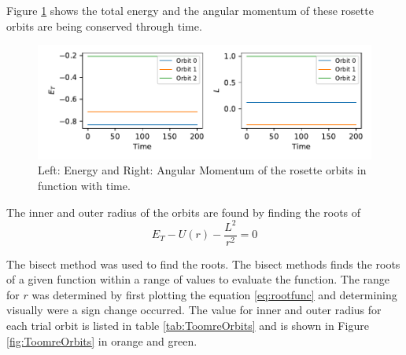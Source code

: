 Figure \ref{fig:conservedQuants} shows the total energy and the angular momentum of these rosette orbits are being conserved through time. 
\begin{figure}[h]
    \centering
    \includegraphics{CodeAndFigures/EnergyMomentumPlot.pdf}
    \caption{Left: Energy and Right: Angular Momentum of the rosette orbits in function with time.}
    \label{fig:conservedQuants}
\end{figure}

The inner and outer radius of the orbits are found by finding the roots of
\begin{equation}
    E_T - U(r) - \frac{L^2}{r^2} = 0
    \label{eq:rootfunc}
\end{equation}

The bisect method was used to find the roots. The bisect methods finds the roots of a given function within a range of values to evaluate the function. The range for $r$ was determined by first plotting the equation \ref{eq:rootfunc} and determining visually were a sign change occurred. The value for inner and outer radius for each trial orbit is listed in table \ref{tab:ToomreOrbits} and is shown in Figure \ref{fig:ToomreOrbits} in orange and green. 

\clearpage


